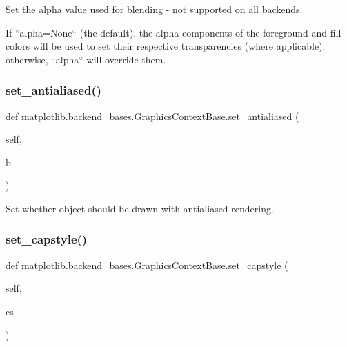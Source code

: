 \begin{DoxyVerb}Set the alpha value used for blending - not supported on all backends.

If ``alpha=None`` (the default), the alpha components of the
foreground and fill colors will be used to set their respective
transparencies (where applicable); otherwise, ``alpha`` will override
them.
\end{DoxyVerb}
 \mbox{\label{classmatplotlib_1_1backend__bases_1_1GraphicsContextBase_ab1026795889d69454aa6ca65608ad11a}} 
\subsubsection{\texorpdfstring{set\+\_\+antialiased()}{set\_antialiased()}}
{\footnotesize\ttfamily def matplotlib.\+backend\+\_\+bases.\+Graphics\+Context\+Base.\+set\+\_\+antialiased (\begin{DoxyParamCaption}\item[{}]{self,  }\item[{}]{b }\end{DoxyParamCaption})}

\begin{DoxyVerb}Set whether object should be drawn with antialiased rendering.\end{DoxyVerb}
 \mbox{\label{classmatplotlib_1_1backend__bases_1_1GraphicsContextBase_a2c18300f4f79a13b2183be50572c4dcb}} 
\subsubsection{\texorpdfstring{set\+\_\+capstyle()}{set\_capstyle()}}
{\footnotesize\ttfamily def matplotlib.\+backend\+\_\+bases.\+Graphics\+Context\+Base.\+set\+\_\+capstyle (\begin{DoxyParamCaption}\item[{}]{self,  }\item[{}]{cs }\end{DoxyParamCaption})}

